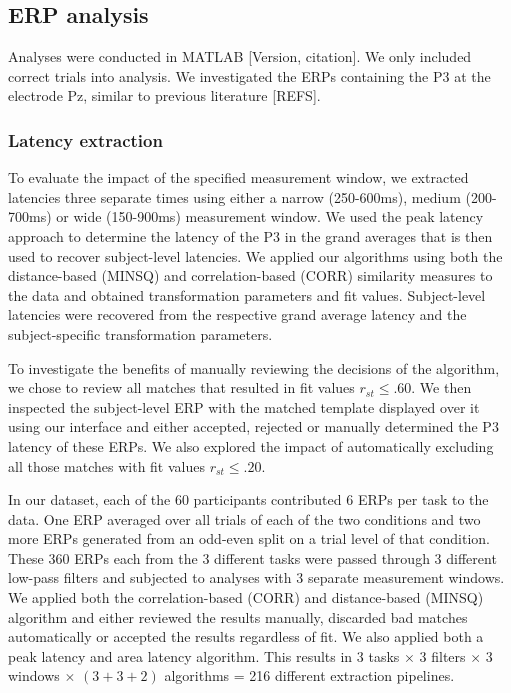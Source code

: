 \documentclass[
  man,floatsintext]{apa7}
\begin{document}
\hypertarget{erp-analysis}{%
\subsection{ERP analysis}\label{erp-analysis}}

Analyses were conducted in MATLAB {[}Version, citation{]}. We only included correct trials into analysis. We investigated the ERPs containing the P3 at the electrode Pz, similar to previous literature {[}REFS{]}.

\hypertarget{latency-extraction}{%
\subsubsection{Latency extraction}\label{latency-extraction}}

To evaluate the impact of the specified measurement window, we extracted latencies three separate times using either a narrow (250-600ms), medium (200-700ms) or wide (150-900ms) measurement window. We used the peak latency approach to determine the latency of the P3 in the grand averages that is then used to recover subject-level latencies. We applied our algorithms using both the distance-based (MINSQ) and correlation-based (CORR) similarity measures to the data and obtained transformation parameters and fit values. Subject-level latencies were recovered from the respective grand average latency and the subject-specific transformation parameters.

To investigate the benefits of manually reviewing the decisions of the algorithm, we chose to review all matches that resulted in fit values \(r_{st} \le .60\). We then inspected the subject-level ERP with the matched template displayed over it using our interface and either accepted, rejected or manually determined the P3 latency of these ERPs.
We also explored the impact of automatically excluding all those matches with fit values \(r_{st} \le .20\).

In our dataset, each of the 60 participants contributed 6 ERPs per task to the data. One ERP averaged over all trials of each of the two conditions and two more ERPs generated from an odd-even split on a trial level of that condition. These 360 ERPs each from the 3 different tasks were passed through 3 different low-pass filters and subjected to analyses with 3 separate measurement windows. We applied both the correlation-based (CORR) and distance-based (MINSQ) algorithm and either reviewed the results manually, discarded bad matches automatically or accepted the results regardless of fit. We also applied both a peak latency and area latency algorithm. This results in 3 tasks \(\times\) 3 filters \(\times\) 3 windows \(\times\) \((3 + 3 + 2)\) algorithms = 216 different extraction pipelines.
\end{document}
